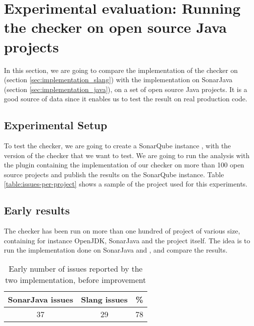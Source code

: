 \section{Experimental evaluation: \newline Running the checker on open source Java projects}
\label{sec:running_checker}

In this section, we are going to compare the implementation of the checker on \slang{} (section \ref{sec:implementation_slang}) with the implementation on SonarJava (section \ref{sec:implementation_java}), on a set of open source Java projects. It is a good source of data since it enables us to test the result on real production code.

\subsection{Experimental Setup}
\label{subsec:experimental_setup}

To test the checker, we are going to create a SonarQube instance \cite{SonarQube:2019:Online}, with the version of the checker that we want to test. We are going to run the analysis with the plugin containing the implementation of our checker on more than 100 open source projects and publish the results on the SonarQube instance. Table \ref{table:issues-per-project} shows a sample of the project \cite{ListOpenSource:2019:Online} used for this experiments.

\subsection{Early results}
\label{subsec:early_results}

The checker has been run on more than one hundred of project of various size, containing for instance OpenJDK, SonarJava and the \slang{} project itself. 
The idea is to run the implementation done on SonarJava and \slang, and compare the results.

\begin{table}[h]
	\centering
	\caption{Early number of issues reported by the two implementation, before improvement}
	\label{table:early-sonarjava-vs-slang}
	\begin{tabular}{|c|c|c|}
		\hline
		\bf SonarJava issues & \bf Slang issues & \bf \% \\ \hline
		37 &  29 &  78 \\ \hline
	\end{tabular}
\end{table}


